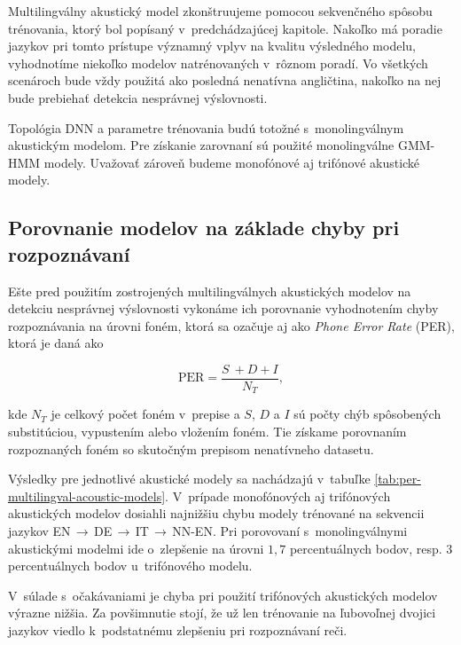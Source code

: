 Multilingválny akustický model zkonštruujeme pomocou sekvenčného spôsobu trénovania, ktorý bol popísaný v~predchádzajúcej kapitole. Nakoľko má poradie jazykov pri tomto prístupe významný vplyv na kvalitu výsledného modelu, vyhodnotíme niekoľko modelov natrénovaných v~rôznom poradí. Vo všetkých scenároch bude vždy použitá ako posledná nenatívna angličtina, nakoľko na nej bude prebiehať detekcia nesprávnej výslovnosti.

Topológia DNN a parametre trénovania budú totožné s~monolingválnym akustickým modelom. Pre získanie zarovnaní sú použité monolingválne  GMM-HMM modely. Uvažovať zároveň budeme monofónové aj trifónové akustické modely.

\subsection{Porovnanie modelov na základe chyby pri rozpoznávaní}

Ešte pred použitím zostrojených multilingválnych akustických modelov na detekciu nesprávnej výslovnosti vykonáme ich porovnanie vyhodnotením chyby rozpoznávania na úrovni foném, ktorá sa ozačuje aj ako \textit{Phone Error Rate} (PER), ktorá je daná ako 

\begin{equation}
    \text{PER} = \frac{S~+ D + I}{N_T},
\end{equation}

\noindent kde $N_T$ je celkový počet foném v~prepise a $S$, $D$ a $I$ sú počty chýb spôsobených substitúciou, vypustením alebo vložením foném. Tie získame porovnaním rozpoznaných foném so skutočným prepisom nenatívneho datasetu.

Výsledky pre jednotlivé akustické modely sa nachádzajú v~tabuľke \ref{tab:per-multilingval-acoustic-models}. V~prípade monofónových aj trifónových akustických modelov dosiahli najnižšiu chybu modely trénované na sekvencii jazykov EN\,$\rightarrow$\,DE\,$\rightarrow$\,IT\,$\rightarrow$\,NN-EN. Pri porovovaní s~monolingválnymi akustickými modelmi ide o~zlepšenie na úrovni $1{,}7$ percentuálnych bodov, resp. $3$ percentuálnych bodov u~trifónového modelu. 

V~súlade s~očakávaniami je chyba pri použití trifónových akustických modelov výrazne nižšia. Za povšimnutie stojí, že už len trénovanie na ľubovoľnej dvojici jazykov viedlo k~podstatnému zlepšeniu pri rozpoznávaní reči.  

